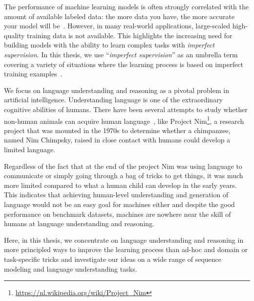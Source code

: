 
The performance of machine learning models is often strongly correlated with the amount of available labeled data:
the more data you have, the more accurate your model will be~\citep{halevy2009unreasonable,sun2017revisiting}.  
However, in many real-world applications, large-scaled high-quality training data is not available.
This highlights the increasing need for building models with the ability to learn complex tasks with \emph{imperfect supervision}. 
In this thesis, we use ``\emph{imperfect supervision}'' as an umbrella term covering a variety of situations where the learning process is based on imperfect training examples~\citep{zhou2018brief}.


We focus on language understanding and reasoning as a pivotal problem in artificial intelligence.  Understanding language is one of the extraordinary cognitive abilities of humans. 
There have been several attempts to study whether non-human animals can acquire human language~\citep{pepperberg2017animal}, like Project Nim\footnote{\url{https://nl.wikipedia.org/wiki/Project_Nim}}, a research project that was mounted in the 1970s to determine whether a chimpanzee, named Nim Chimpsky, raised in close contact with humans could develop a limited language. 

Regardless of the fact that at the end of the project Nim was using language to communicate or simply going through a bag of tricks to get things, it was much more limited compared to what a human child can develop in the early years. 
%
This indicates that achieving human-level understanding and generation of language would not be an easy goal for machines either and despite the good performance on benchmark datasets, machines are nowhere near the skill of humans at language understanding and reasoning.

Here, in this thesis, we concentrate on language understanding and reasoning in more principled ways to improve the learning process than ad-hoc and domain or task-specific tricks and investigate our ideas on a wide range of sequence modeling and language understanding tasks.


